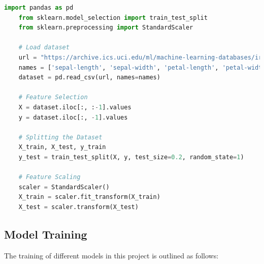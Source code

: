 \documentclass[a4paper]{article}
\begin{document}
\begin{lstlisting}[language=Python]
	import pandas as pd
	from sklearn.model_selection import train_test_split
	from sklearn.preprocessing import StandardScaler
	
	# Load dataset
	url = "https://archive.ics.uci.edu/ml/machine-learning-databases/iris/iris.data"
	names = ['sepal-length', 'sepal-width', 'petal-length', 'petal-width', 'class']
	dataset = pd.read_csv(url, names=names)
	
	# Feature Selection
	X = dataset.iloc[:, :-1].values
	y = dataset.iloc[:, -1].values
	
	# Splitting the Dataset
	X_train, X_test, y_train
	y_test = train_test_split(X, y, test_size=0.2, random_state=1)
	
	# Feature Scaling
	scaler = StandardScaler()
	X_train = scaler.fit_transform(X_train)
	X_test = scaler.transform(X_test)
\end{lstlisting}

\subsection{Model Training}

The training of different models in this project is outlined as follows:
\end{document}
